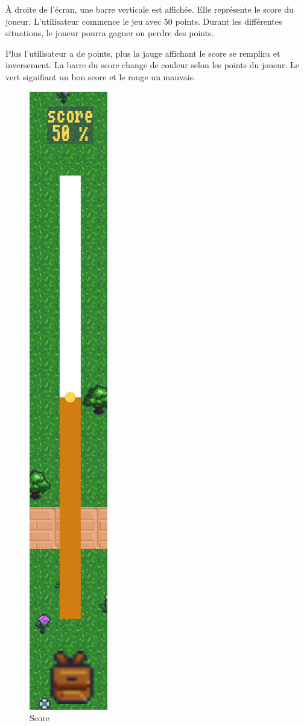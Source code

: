 À droite de l'écran, une barre verticale est affichée. Elle représente le score du joueur. L'utilisateur commence le jeu avec 50 points. Durant les différentes situations, le joueur pourra gagner ou perdre des points.

Plus l'utilisateur a de points, plus la jauge affichant le score se remplira et inversement. La barre du score change de couleur selon les points du joueur. Le vert signifiant un bon score et le rouge un mauvais.
\begin{figure}[H]
    \centering
    \includegraphics[height=0.4\textheight ]{images/score.png}
    \caption{Score}
    \label{fig:pic_dessus}
\end{figure} 

